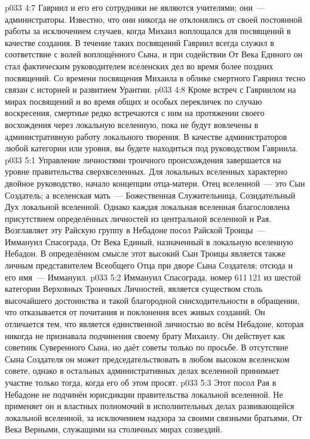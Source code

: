 \vs p033 4:7 \pc Гавриил и его его сотрудники не являются учителями; они~--- администраторы. Известно, что они никогда не отклонялись от своей постоянной работы за исключением случаев, когда Михаил воплощался для посвящений в качестве создания. В течение таких посвящений Гавриил всегда служил в соответствие с волей воплощённого Сына, и при содействии От Века Единого он стал фактическим руководителем вселенских дел во время более поздних посвящений. Со времени посвящения Михаила в облике смертного Гавриил тесно связан с историей и развитием Урантии.
\vs p033 4:8 Кроме встреч с Гавриилом на мирах посвящений и во время общих и особых перекличек по случаю воскресения, смертные редко встречаются с ним на протяжении своего восхождения через локальную вселенную, пока не будут вовлечены в административную работу локального творения. В качестве администраторов любой категории или уровня, вы будете находиться под руководством Гавриила.
\vs p033 5:1 Управление личностями троичного происхождения завершается на уровне правительства сверхвселенных. Для локальных вселенных характерно двойное руководство, начало концепции отца\hyp{}матери. Отец вселенной~--- это Сын Создатель; а вселенская мать~--- Божественная Служительница, Созидательный Дух локальной вселенной. Однако каждая локальная вселенная благословлена присутствием определённых личностей из центральной вселенной и Рая. Возглавляет эту Райскую группу в Небадоне посол Райской Троицы~--- Иммануил Спасограда, От Века Единый, назначенный в локальную вселенную Небадон. В определённом смысле этот высокий Сын Троицы является также личным представителем Всеобщего Отца при дворе Сына Создателя; отсюда и его имя~--- Иммануил.
\vs p033 5:2 Иммануил Спасограда, номер 611\,121 из шестой категории Верховных Троичных Личностей, является существом столь высочайшего достоинства и такой благородной снисходительности в обращении, что отказывается от почитания и поклонения всех живых созданий. Он отличается тем, что является единственной личностью во всём Небадоне, которая никогда не признавала подчинения своему брату Михаилу. Он действует как советник Суверенного Сына, но даёт советы только по просьбе. В отсутствие Сына Создателя он может председательствовать в любом высоком вселенском совете, однако в остальных административных делах вселенной принимает участие только тогда, когда его об этом просят.
\vs p033 5:3 Этот посол Рая в Небадоне не подчинён юрисдикции правительства локальной вселенной. Не применяет он и властных полномочий в исполнительных делах развивающейся локальной вселенной, за исключением надзора за своими связными братьями, От Века Верными, служащими на столичных мирах созвездий.
